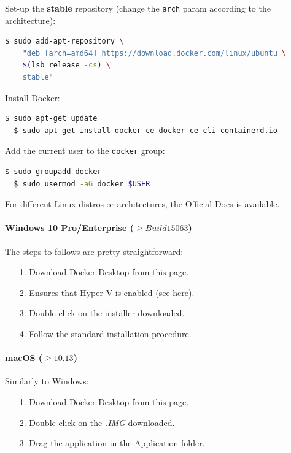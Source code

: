 \noindent Set-up the \textbf{stable} repository (change the \texttt{arch} param according to the architecture):
\begin{lstlisting}[language=bash, showstringspaces=false, basicstyle=\ttfamily]
  $ sudo add-apt-repository \
    "deb [arch=amd64] https://download.docker.com/linux/ubuntu \
    $(lsb_release -cs) \
    stable"
\end{lstlisting}

\noindent Install Docker:
\begin{lstlisting}[language=bash]
  $ sudo apt-get update
  $ sudo apt-get install docker-ce docker-ce-cli containerd.io
\end{lstlisting}

\noindent Add the current user to the \texttt{docker} group:
\begin{lstlisting}[language=bash]
  $ sudo groupadd docker
  $ sudo usermod -aG docker $USER
\end{lstlisting}

\noindent For different Linux distros or architectures, the \href{https://docs.docker.com/engine/install/}{Official Docs} is available.

\paragraph{Windows 10 Pro/Enterprise ($\geq Build 15063$)} The steps to follows are pretty straightforward:

\begin{itemize}
    \item[1.] Download Docker Desktop from \href{https://hub.docker.com/editions/community/docker-ce-desktop-windows/}{this} page.
    \item[2.] Ensures that Hyper-V is enabled (see \href{https://docs.microsoft.com/en-us/virtualization/hyper-v-on-windows/quick-start/enable-hyper-v}{here}).
    \item[3.] Double-click on the installer downloaded.
    \item[4.] Follow the standard installation procedure.
\end{itemize}

\paragraph{macOS ($\geq 10.13$)} Similarly to Windows:

\begin{itemize}
    \item[1.] Download Docker Desktop from \href{https://hub.docker.com/editions/community/docker-ce-desktop-mac/}{this} page.
    \item[2.] Double-click on the \textit{.IMG} downloaded.
    \item[3.] Drag the application in the Application folder.
\end{itemize}

